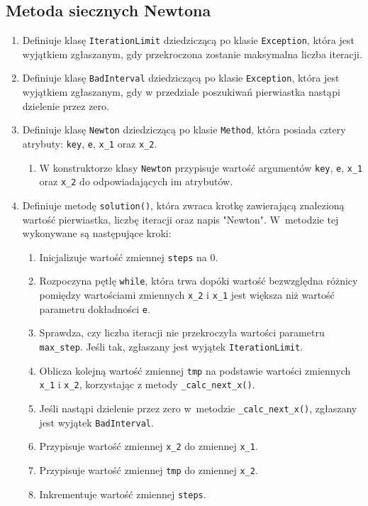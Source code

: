 \documentclass[12pt]{article}
\begin{document}
\subsection{Metoda siecznych Newtona}
\begin{enumerate}
\item Definiuje klasę \verb|IterationLimit| dziedziczącą po klasie \verb|Exception|, która jest wyjątkiem zgłaszanym, gdy przekroczona zostanie maksymalna liczba iteracji.
\item Definiuje klasę \verb|BadInterval| dziedziczącą po klasie \verb|Exception|, która jest wyjątkiem zgłaszanym, gdy w przedziale poszukiwań pierwiastka nastąpi dzielenie przez zero.
\item Definiuje klasę \verb|Newton| dziedziczącą po klasie \verb|Method|, która posiada cztery atrybuty: \verb|key|, \verb|e|, \verb|x_1| oraz \verb|x_2|.
\begin{enumerate}
\item W konstruktorze klasy \verb|Newton| przypisuje wartość argumentów \verb|key|, \verb|e|, \verb|x_1| oraz \verb|x_2| do odpowiadających im atrybutów.
\end{enumerate}
\item Definiuje metodę \verb|solution()|, która zwraca krotkę zawierającą znalezioną wartość pierwiastka, liczbę iteracji oraz napis "Newton". W~metodzie tej wykonywane są następujące kroki:
\begin{enumerate}
\item Inicjalizuje wartość zmiennej \verb|steps| na 0.
\item Rozpoczyna pętlę \verb|while|, która trwa dopóki wartość bezwzględna różnicy pomiędzy wartościami zmiennych \verb|x_2| i \verb|x_1| jest większa niż wartość parametru dokładności \verb|e|.
\item Sprawdza, czy liczba iteracji nie przekroczyła wartości parametru \verb|max_step|. Jeśli tak, zgłaszany jest wyjątek \verb|IterationLimit|.
\item Oblicza kolejną wartość zmiennej \verb|tmp| na podstawie wartości zmiennych \verb|x_1| i \verb|x_2|, korzystając z metody \verb|_calc_next_x()|.
\item Jeśli nastąpi dzielenie przez zero w~metodzie \verb|_calc_next_x()|, zgłaszany jest wyjątek \verb|BadInterval|.
\item Przypisuje wartość zmiennej \verb|x_2| do zmiennej \verb|x_1|.
\item Przypisuje wartość zmiennej \verb|tmp| do zmiennej \verb|x_2|.
\item Inkrementuje wartość zmiennej \verb|steps|.

\end{enumerate}
\end{enumerate}
\end{document}
